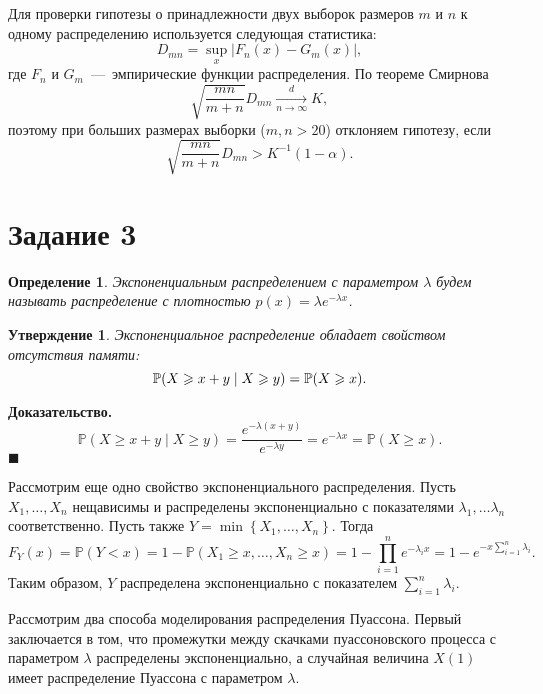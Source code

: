 \documentclass[12pt, a4paper]{article} %
\renewcommand{\ge}{\geqslant}
\def\Pro{\mathbb{P}} %
\newcommand*{\hm}[1]{#1\nobreak\discretionary{}%
            {\hbox{\mathsurround=0pt #1}}{}}
\newtheorem{St}{Утверждение}
\newtheorem{Def}{Определение}
\newenvironment{Proof}{\par\textbf{Доказательство. }}
	{\hfill$\blacksquare$\vspace{0.1cm}}
\begin{document}
Для проверки гипотезы о принадлежности двух выборок размеров $m$ и  $n$ к одному распределению используется следующая статистика:
 \[
     D_{mn} = \sup\limits_x \bigl\lvert F_n(x) - G_m(x) \bigr\rvert,
\] 
где $F_n$ и  $G_m$~---~эмпирические функции распределения.
По теореме Смирнова 
 \[
     \sqrt{\frac{mn}{m+n}}D_{mn} \xrightarrow[n\rightarrow \infty]{d} K,
\] 
поэтому при больших размерах выборки ($m, n > 20$) отклоняем гипотезу, если 
\[
    \sqrt{\frac{mn}{m+n}}D_{mn} > K^{-1}(1 - \alpha).
\] 

\section*{Задание 3}

\begin{Def}
    Экспоненциальным распределением с параметром $\lambda$ будем называть 
    распределение с плотностью $p(x) = \lambda e^{-\lambda x}$.
\end{Def} 
\begin{St}
    Экспоненциальное распределение обладает свойством отсутствия памяти:
    $$
    \Pro (X \ge x + y \mid X \ge y) \hm= \Pro(X \ge x).
    $$
\end{St} 
\begin{Proof}
    \begin{equation*}
        \Pro (X \ge x + y \mid X \ge y) = 
        \frac{e^{-\lambda (x + y)}}{e^{-\lambda y}} = e^{-\lambda x} = 
        \Pro(X \ge x).
    \end{equation*}
\end{Proof} 

Рассмотрим еще одно свойство экспоненциального распределения.
Пусть $X_1, \ldots , X_n$ нещависимы и распределены экспоненциально с
показателями $\lambda_1,\ldots \lambda_n$ соответственно.
Пусть также $Y = \min \left\{ X_1,\ldots , X_n \right\}$.
Тогда 
\[
    F_Y(x) =\Pro(Y < x) = 
    1 - \Pro\left( X_1 \ge x,\ldots , X_n \ge x \right) =
    1 - \prod\limits_{i=1}^{n} e^{-\lambda_i x} =
    1 - e^{-x\sum\limits_{i=1}^{n} \lambda_i}.
\] 
Таким образом, $Y$ распределена экспоненциально с показателем  $\sum\limits_{i=1}^{n} \lambda_i$.

Рассмотрим два способа моделирования распределения Пуассона.
Первый заключается в том, что промежутки между скачками пуассоновского 
процесса с параметром $\lambda$ распределены экспоненциально, 
а случайная величина  $X(1)$ имеет распределение Пуассона с параметром  $\lambda$.
\end{document}
